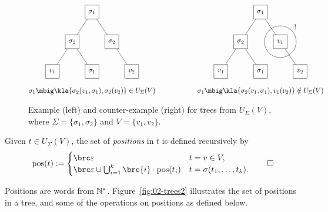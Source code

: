 \begin{figure}[t!]
 \[\begin{matrix}
  \begin{tikzpicture}[every node/.style={rectangle,draw,minimum size=2em},baseline=(current bounding box.center)]
   \node (n)   at (+0,+0.0) { $\sigma_1$ };
   \node (n1)  at (-1,-1.5) { $\sigma_2$ } edge (n);
   \node (n2)  at (+1,-1.5) { $\sigma_2$ } edge (n);
   \node (n11) at (-2,-3.0) { $v_1$ } edge (n1);
   \node (n12) at (+0,-3.0) { $\sigma_1$ } edge (n1);
   \node (n21) at (+2,-3.0) { $v_2$ } edge (n2);
  \end{tikzpicture}
  &\hspace*{4em}&
  \begin{tikzpicture}[every node/.style={rectangle,draw,minimum size=2em},baseline=(current bounding box.center)]
   \node (n)   at (+0,+0.0) { $\sigma_1$ };
   \node (n1)  at (-1,-1.5) { $\sigma_2$ } edge (n);
   \node (n2)  at (+1,-1.5) { $v_1$ } edge (n);
   \node (n11) at (-2,-3.0) { $v_1$ } edge (n1);
   \node (n12) at (+0,-3.0) { $\sigma_1$ } edge (n1);
   \node (n21) at (+2,-3.0) { $v_2$ } edge (n2);
   \draw (n2) circle (0.8);
   \node[draw=none] at (+1.75,-0.75) {!};
  \end{tikzpicture}
  \\\\
  \sigma_1\mbig\kla{\sigma_2(v_1,\sigma_1), \sigma_2(v_2)} \in U_\Sigma(V) &&
  \sigma_1\mbig\kla{\sigma_2(v_1,\sigma_1), v_1(v_2)} \notin U_\Sigma(V)
 \end{matrix}\]
 \caption{
  Example (left) and counter-example (right) for trees from $U_\Sigma(V)$,
  where $\Sigma = \{\sigma_1,\sigma_2\}$ and $V = \{v_1,v_2\}$.
  \label{fig:02-trees1}
 }
\end{figure}

\begin{definition}
 Given $t\in U_\Sigma(V)$, the set of \emph{positions} in $t$ is defined recursively by
 \[
  \pos(t) := \begin{cases}
   \brc\eps & t = v\in V, \\
   \brc\eps\cup \bigcup_{i=1}^k \brc{i} \cdot \pos(t_i) & t = \sigma(t_1,\ldots,t_k).
  \end{cases}
  \qedhere
 \]
\end{definition}

Positions are words from $\mathbb N^*$. Figure~\ref{fig:02-trees2} illustrates the
set of positions in a tree, and some of the operations on positions as defined
below.

